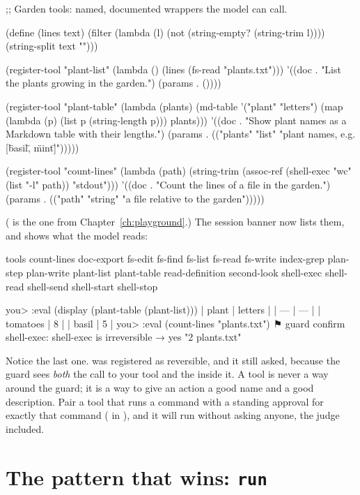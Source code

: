 \begin{scm}
;; Garden tools: named, documented wrappers the model can call.

(define (lines text)
  (filter (lambda (l) (not (string-empty? (string-trim l))))
          (string-split text "\n")))

(register-tool "plant-list"
  (lambda () (lines (fs-read "plants.txt")))
  '((doc . "List the plants growing in the garden.")
    (params . ())))

(register-tool "plant-table"
  (lambda (plants)
    (md-table '("plant" "letters")
              (map (lambda (p) (list p (string-length p))) plants)))
  '((doc . "Show plant names as a Markdown table with their lengths.")
    (params . (("plants" "list" "plant names, e.g. [\"basil\", \"mint\"]")))))

(register-tool "count-lines"
  (lambda (path)
    (string-trim (assoc-ref (shell-exec "wc" (list "-l" path)) "stdout")))
  '((doc . "Count the lines of a file in the garden.")
    (params . (("path" "string" "a file relative to the garden")))))
\end{scm}

( is the one from Chapter~\ref{ch:playground}.) The session
banner now lists them, and  shows what the model reads:

\begin{txt}
tools count-lines doc-export fs-edit fs-find fs-list fs-read fs-write
      index-grep plan-step plan-write plant-list plant-table read-definition
      second-look shell-exec shell-read shell-send shell-start shell-stop

you> :eval (display (plant-table (plant-list)))
| plant | letters |
| --- | --- |
| tomatoes | 8 |
| basil | 5 |
you> :eval (count-lines "plants.txt")
⚑ guard confirm shell-exec: shell-exec is irreversible → yes
"2 plants.txt"
\end{txt}

Notice the last one.  was registered as reversible, and
it still asked, because the guard sees \emph{both} the call to your tool
and the  inside it. A tool is never a way around the
guard; it is a way to give an action a good name and a good description.
Pair a tool that runs a command with a standing approval for exactly that
command ( in ), and it
will run without asking anyone, the judge included.

\section{The pattern that wins: \texttt{run}}

